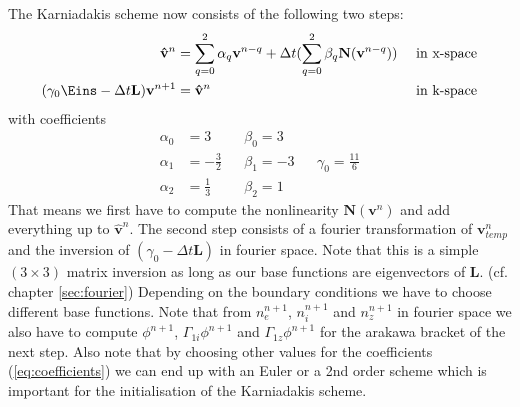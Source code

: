 \documentclass[a4paper,12pt]{scrartcl}
\renewcommand{\vec}[1]{{\mathbf{#1}}}
\begin{document}
The Karniadakis scheme now consists of the following two steps:
\begin{align}
    \vec {\hat v}^n &= \sum_{q=0}^2 \alpha_q\vec v^{n-q} + \Delta t(\sum_{q=0}^2\beta_q \vec N(\vec v^{n-q})) \ &\text{in x-space} \\
    (\gamma_0 \vec \Eins  - \Delta t \vec L) \vec v^{n+1} &= \vec {\hat v}^n  \ &\text{in k-space}
\end{align}
with coefficients
\begin{align}
    \alpha_0 &= 3 \  &&\beta_0 = 3 \nonumber \\
    \alpha_1 &= -\frac{3}{2} && \beta_1 = -3 && \gamma_0 = \frac{11}{6}\label{eq:coefficients}\\
    \alpha_2 &= \frac{1}{3} && \beta_2 = 1 \nonumber
\end{align}
That means we first have to compute the nonlinearity $\vec N(\vec v^{n})$ and add everything up to $\vec {\hat v}^n$. The second step consists of a fourier transformation of $\vec v^n_{temp}$ and the inversion 
of $(\gamma_0 - \Delta t \vec L)$ in fourier space. Note that this is a simple 
$(3\times3)$ matrix inversion as long as our base functions are eigenvectors of $\vec L$. (cf. chapter \ref{sec:fourier}) Depending on the boundary conditions we have to choose different base functions.
Note that from $n^{n+1}_e$, $n^{n+1}_i$ and $n^{n+1}_z$ in fourier space we also have to compute $\phi^{n+1}$, $\Gamma_{1i}\phi^{n+1}$ and $\Gamma_{1z}\phi^{n+1}$ for the arakawa bracket of the next step.
Also note that by choosing other values for the coefficients (\ref{eq:coefficients}) 
we can end up with an Euler or a 2nd order scheme which is important for the 
initialisation of the Karniadakis scheme.
\end{document}
